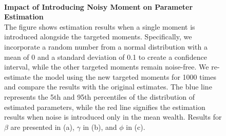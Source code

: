 \begin{figure}[!htb]
    \centering
    \caption{\textbf{Impact of Introducing Noisy Moment on Parameter Estimation} \\ 
    \small{
    The figure shows estimation results when a single moment is introduced alongside the targeted moments. Specifically, we incorporate a random number from a normal distribution with a mean of 0 and a standard deviation of 0.1 to create a confidence interval, while the other targeted moments remain noise-free. We re-estimate the model using the new targeted moments for 1000 times and compare the results with the original estimates. The blue line represents the 5th and 95th percentiles of the distribution of estimated parameters, while the red line signifies the estimation results when noise is introduced only in the mean wealth. Results for $\beta$ are presented in (a), $\gamma$ in (b), and $\phi$ in (c).
    }
    }
    \label{fig:moment_inclusion}

    \\
\end{figure}